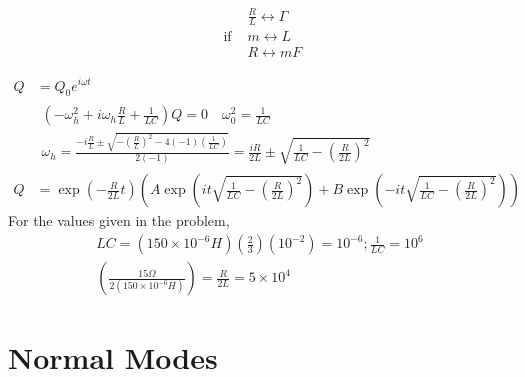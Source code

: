\documentclass[twoside,10pt]{amsart}
\begin{document}
\[
\begin{aligned}
& \frac{R}{L} \longleftrightarrow \Gamma  \\
\text{ if } & m \longleftrightarrow L \\
& R \longleftrightarrow mF
\end{aligned}
\]

\[
\begin{aligned}
Q & = Q_0 e^{i\omega t }  \\
& \begin{gathered} 
  \left( -\omega_h^2 + i \omega_h \frac{R}{L} + \frac{1}{LC}  \right) Q = 0 \quad \omega_0^2 = \frac{1}{LC}  \\
  \omega_h = \frac{ -i \frac{R}{L} \pm \sqrt{ - \left( \frac{R}{L} \right)^2 - 4 (-1)\left( \frac{1}{LC} \right) } }{ 2 (-1) }  = \frac{ iR}{2L} \pm \sqrt{ \frac{1}{LC} - \left( \frac{R}{2L} \right)^2 }  
\end{gathered}  \\
Q & = \exp{ \left( -\frac{R}{2L}t \right)} (A \exp{( it \sqrt{ \frac{1}{LC} - \left( \frac{R}{2L} \right)^2 } )} + B  \exp{( -it \sqrt{ \frac{1}{LC} - \left( \frac{R}{2L} \right)^2 } )} )  
\end{aligned}
\]
For the values given in the problem,
\[
\begin{gathered}
  LC = (150 \times 10^{-6} H)(\frac{2}{3} )(10^{-2}) = 10^{-6}; \frac{1}{LC} = 10^6  \\
  \left( \frac{ 15 \Omega}{ 2 (150 \times 10^{-6} H) } \right)= \frac{R}{2L} = 5\times 10^4
\end{gathered}
\]

\section{  Normal Modes }
\end{document}
